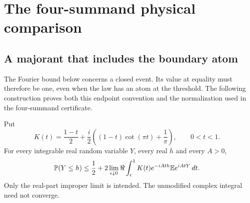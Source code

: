\section{The four-summand physical comparison}\label{ext:four-summand-details}
\subsection{A majorant that includes the boundary atom}
\label{ext:closed-half-line}

The Fourier bound below concerns a closed event. Its value at equality
must therefore be one, even when the law has an atom at the threshold.
The following construction proves both this endpoint convention and the
normalization used in the four-summand certificate.

\begin{lemma}\label{ext:prawitz:majorant}
Put
\[
 K(t)=\frac{1-t}{2}+\frac{i}{2}
       \left((1-t)\cot(\pi t)+\frac1\pi\right),\qquad 0<t<1.
\]
For every integrable real random variable $Y$, every real $h$ and every
$A>0$,
\begin{equation}\label{ext:prawitz:expectation}
 \mathbb P(Y\le h)\le\frac12+
  2\lim_{\epsilon\downarrow0}\Re\int_\epsilon^1
 K(t)e^{-iAth}\mathbb E e^{iAtY}\,dt.
\end{equation}
Only the real-part improper limit is intended. The unmodified complex
integral need not converge.
\end{lemma}
